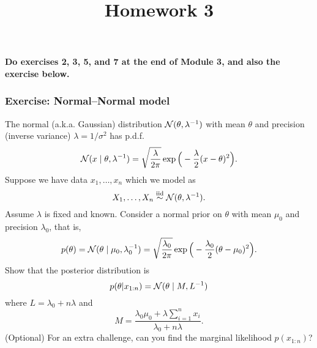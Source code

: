 \documentclass[12pt]{article}
\title{Homework 3}
\author{}
\date{}
\begin{document}
\maketitle

\textbf{Do exercises 2, 3, 5, and 7 at the end of Module 3, and also the exercise below.}

\subsubsection*{Exercise: Normal--Normal model}

The normal (a.k.a. Gaussian) distribution $\mathcal{N}(\theta,\lambda^{-1})$ with mean $\theta$ and precision (inverse variance) $\lambda = 1/\sigma^2$ has p.d.f.
$$ \mathcal{N}(x\mid \theta,\lambda^{-1}) = 
\sqrt{\frac{\lambda}{2\pi}}\exp\Big(-\frac{\lambda}{2}(x-\theta)^2\Big). $$
Suppose we have data $x_1,\ldots,x_n$ which we model as
$$X_1,\ldots,X_n\stackrel{\mathrm{iid}}{\sim}\mathcal{N}(\theta,\lambda^{-1}).$$
Assume $\lambda$ is fixed and known.  Consider a normal prior on $\theta$ with mean $\mu_0$ and
precision $\lambda_0$, that is,
$$ p(\theta) = \mathcal{N}(\theta\mid\mu_0,\lambda_0^{-1}) = 
\sqrt{\frac{\lambda_0}{2\pi}}\exp\Big(-\frac{\lambda_0}{2}(\theta-\mu_0)^2\Big). $$
Show that the posterior distribution is 
$$p(\theta|x_{1:n}) = \mathcal{N}(\theta\mid M,L^{-1}) $$
where $L = \lambda_0 + n\lambda$ and
$$M = \frac{\lambda_0\mu_0 + \lambda \sum_{i=1}^n x_i}{\lambda_0 + n\lambda}.$$
\vspace{2em}
(Optional) For an extra challenge, can you find the marginal likelihood $p(x_{1:n})$?
\end{document}
